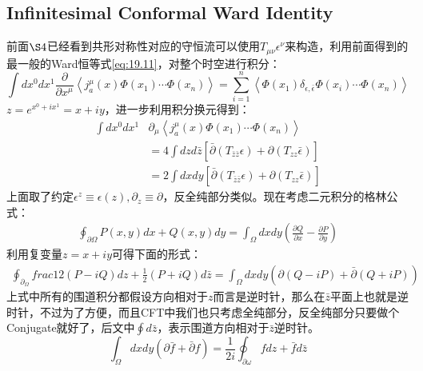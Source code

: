 \subsection{Infinitesimal Conformal Ward Identity}
前面$\S 4$已经看到共形对称性对应的守恒流可以使用$T_{\mu\nu}\epsilon^\nu$来构造，利用前面得到的最一般的Ward恒等式\ref{eq:19.11}，对整个时空进行积分：
\begin{equation}
	\int dx^0dx^1\frac\partial{\partial x^{\mu}} \left\langle j_{a}^{\mu}(x)\Phi(x_{1})\cdots\Phi(x_{n})\right\rangle  =\sum_{i=1}^{n}\left<\Phi(x_{1})\delta_{\epsilon,\bar \epsilon}\Phi(x_{i})\cdots\Phi(x_{n})\right>
\end{equation}
$z=e^{x^0+ix^1}=x+iy$，进一步利用积分换元得到：
\begin{equation}
	\begin{aligned}
		\int dx^0dx^1&\partial_\mu\left\langle j_{a}^{\mu}(x)\Phi(x_{1})\cdots\Phi(x_{n})\right\rangle\\
		&=4\int dzd\bar z\left[\bar\partial(T_{\bar z\bar z}\epsilon)+\partial(T_{zz}\bar\epsilon)\right]\\
		&=2\int dxdy\left[\bar\partial(T_{\bar z\bar z}\epsilon)+\partial(T_{zz}\bar\epsilon)\right]
	\end{aligned}
\end{equation}
上面取了约定$\epsilon^z\equiv\epsilon(z),\partial_z\equiv\partial$，反全纯部分类似。现在考虑二元积分的格林公式：
\begin{equation}
	\begin{aligned}\oint_{\partial\Omega}P(x,y)dx+Q(x,y)dy=\int_\Omega dxdy\left(\frac{\partial Q}{\partial x}-\frac{\partial P}{\partial y}\right)\end{aligned}
\end{equation}
利用复变量$z=x+iy$可得下面的形式：
\begin{equation}
	\begin{aligned}\oint_{\partial_\Omega}frac{1}{2}(P-iQ)dz+\frac{1}{2}(P+iQ)d\bar{z}=\int_\Omega dxdy(\partial(Q-iP)+\bar{\partial}(Q+iP))\end{aligned}
\end{equation}
上式中所有的围道积分都假设方向相对于$z$而言是逆时针，那么在$\bar z$平面上也就是逆时针，不过为了方便，而且CFT中我们也只考虑全纯部分，反全纯部分只要做个Conjugate就好了，后文中$\oint d\bar z$，表示围道方向相对于$\bar z$逆时针。
\begin{equation}
	\int_\Omega dxdy\left(\partial \bar f+\bar\partial f\right)=\frac{1}{2i}\oint_{\partial\omega}fdz+\bar f d\bar z
\end{equation}
